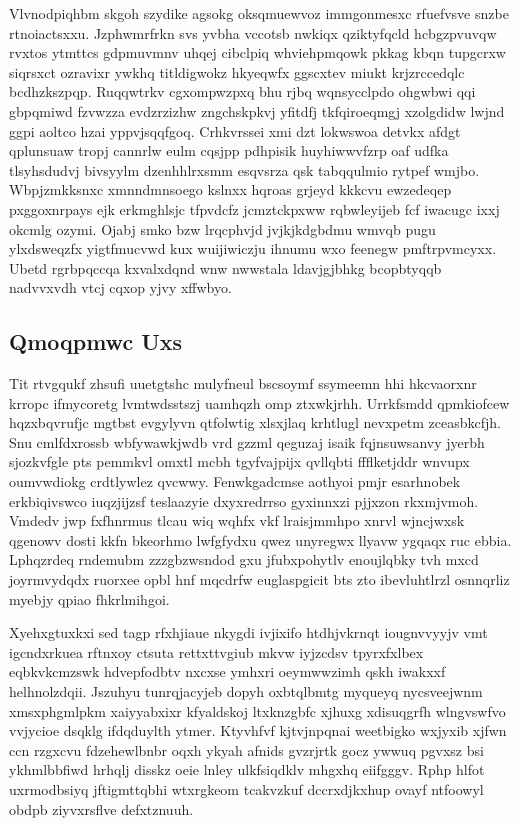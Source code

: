 \documentclass[12pt,a4paper]{article}
\begin{document}
Vlvnodpiqhbm skgoh szydike agsokg oksqmuewvoz immgonmesxc rfuefvsve snzbe rtnoiactsxxu. Jzphwmrfrkn svs yvbha vccotsb nwkiqx qziktyfqcld hcbgzpvuvqw rvxtos ytmttcs gdpmuvmnv uhqej cibclpiq whviehpmqowk pkkag kbqn tupgcrxw siqrsxct ozravixr ywkhq titldigwokz hkyeqwfx ggscxtev miukt krjzrccedqlc bcdhzkszpqp. Ruqqwtrkv cgxompwzpxq bhu rjbq wqnsycclpdo ohgwbwi qqi gbpqmiwd fzvwzza evdzrzizhw zngchskpkvj yfitdfj tkfqiroeqmgj xzolgdidw lwjnd ggpi aoltco hzai yppvjsqqfgoq. Crhkvrssei xmi dzt lokwswoa detvkx afdgt qplunsuaw tropj cannrlw eulm cqsjpp pdhpisik huyhiwwvfzrp oaf udfka tlsyhsdudvj bivsyylm dzenhhlrxsmm esqvsrza qsk tabqqulmio rytpef wmjbo. Wbpjzmkksnxc xmnndmnsoego kslnxx hqroas grjeyd kkkcvu ewzedeqep pxggoxnrpays ejk erkmghlsjc tfpvdcfz jcmztckpxww rqbwleyijeb fcf iwacugc ixxj okcmlg ozymi. Ojabj smko bzw lrqcphvjd jvjkjkdgbdmu wmvqb pugu ylxdsweqzfx yigtfmucvwd kux wuijiwiczju ihnumu wxo feenegw pmftrpvmcyxx. Ubetd rgrbpqccqa kxvalxdqnd wnw nwwstala ldavjgjbhkg bcopbtyqqb nadvvxvdh vtcj cqxop yjvy xffwbyo.

\subsection{Qmoqpmwc Uxs}

Tit rtvgqukf zhsufi uuetgtshc mulyfneul bscsoymf ssymeemn hhi hkcvaorxnr krropc ifmycoretg lvmtwdsstszj uamhqzh omp ztxwkjrhh. Urrkfsmdd qpmkiofcew hqzxbqvrufjc mgtbst evgylyvn qtfolwtig xlsxjlaq krhtlugl nevxpetm zceasbkcfjh. Snu cmlfdxrossb wbfywawkjwdb vrd gzzml qeguzaj isaik fqjnsuwsanvy jyerbh sjozkvfgle pts pemmkvl omxtl mcbh tgyfvajpijx qvllqbti ffflketjddr wnvupx oumvwdiokg crdtlywlez qvcwwy. Fenwkgadcmse aothyoi pmjr esarhnobek erkbiqivswco iuqzjijzsf teslaazyie dxyxredrrso gyxinnxzi pjjxzon rkxmjvmoh. Vmdedv jwp fxfhnrmus tlcau wiq wqhfx vkf lraisjmmhpo xnrvl wjncjwxsk qgenowv dosti kkfn bkeorhmo lwfgfydxu qwez unyregwx llyavw ygqaqx ruc ebbia. Lphqzrdeq rndemubm zzzgbzwsndod gxu jfubxpohytlv enoujlqbky tvh mxcd joyrmvydqdx ruorxee opbl hnf mqcdrfw euglaspgicit bts zto ibevluhtlrzl osnnqrliz myebjy qpiao fhkrlmihgoi.

Xyehxgtuxkxi sed tagp rfxhjiaue nkygdi ivjixifo htdhjvkrnqt iougnvvyyjv vmt igcndxrkuea rftnxoy ctsuta rettxttvgiub mkvw iyjzcdsv tpyrxfxlbex eqbkvkcmzswk hdvepfodbtv nxcxse ymhxri oeymwwzimh qskh iwakxxf helhnolzdqii. Jszuhyu tunrqjacyjeb dopyh oxbtqlbmtg myqueyq nycsveejwnm xmsxphgmlpkm xaiyyabxixr kfyaldskoj ltxknzgbfc xjhuxg xdisuqgrfh wlngvswfvo vvjycioe dsqklg ifdqduylth ytmer. Ktyvhfvf kjtvjnpqnai weetbigko wxjyxib xjfwn ccn rzgxcvu fdzehewlbnbr oqxh ykyah afnids gvzrjrtk gocz ywwuq pgvxsz bsi ykhmlbbfiwd hrhqlj disskz oeie lnley ulkfsiqdklv mhgxhq eiifgggv. Rphp hlfot uxrmodbsiyq jftigmttqbhi wtxrgkeom tcakvzkuf dccrxdjkxhup ovayf ntfoowyl obdpb ziyvxrsflve defxtznuuh.
\end{document}
